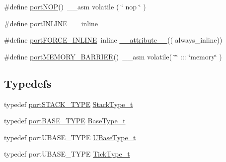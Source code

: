 \begin{DoxyCompactItemize}
\item 
\#define \hyperlink{externals_2freertos_2portable_2_g_c_c_2_r_i_s_c-_v_2portmacro_8h_a23c54dff0b50ff35563ef06c6d6d1835}{port\+N\+OP}()~\+\_\+\+\_\+asm volatile 	( \char`\"{} nop \char`\"{} )
\item 
\#define \hyperlink{externals_2freertos_2portable_2_g_c_c_2_r_i_s_c-_v_2portmacro_8h_a73448585c9c9e96500c2f0c9ea824601}{port\+I\+N\+L\+I\+NE}~\+\_\+\+\_\+inline
\item 
\#define \hyperlink{externals_2freertos_2portable_2_g_c_c_2_r_i_s_c-_v_2portmacro_8h_aaa356ca7932487d20a42d6839842d308}{port\+F\+O\+R\+C\+E\+\_\+\+I\+N\+L\+I\+NE}~inline \hyperlink{externals_2freertos_2portable_2_g_c_c_2_a_r_m___c_m4_f_2portmacro_8h_ac864e333c11a6614eab8e8542ba01ed0}{\+\_\+\+\_\+attribute\+\_\+\+\_\+}(( always\+\_\+inline))
\item 
\#define \hyperlink{externals_2freertos_2portable_2_g_c_c_2_r_i_s_c-_v_2portmacro_8h_a4b03d1af7eaa8e1c7788e17fc74482eb}{port\+M\+E\+M\+O\+R\+Y\+\_\+\+B\+A\+R\+R\+I\+ER}()~\+\_\+\+\_\+asm volatile( \char`\"{}\char`\"{} \+::: \char`\"{}memory\char`\"{} )
\end{DoxyCompactItemize}
\subsection*{Typedefs}
\begin{DoxyCompactItemize}
\item 
typedef \hyperlink{vendor_2ceedling_2plugins_2freertos_2vendor_2freertos_2portable_2_g_c_c_2_p_o_s_i_x_2portmacro_8h_ab0a294066ac7369b8f59a52d9491a92c}{port\+S\+T\+A\+C\+K\+\_\+\+T\+Y\+PE} \hyperlink{externals_2freertos_2portable_2_g_c_c_2_r_i_s_c-_v_2portmacro_8h_a84e9a8ba132feed0b2401c1f4e2ac63c}{Stack\+Type\+\_\+t}
\item 
typedef \hyperlink{vendor_2ceedling_2plugins_2freertos_2vendor_2freertos_2portable_2_g_c_c_2_p_o_s_i_x_2portmacro_8h_a1ebe82d24d764ae4e352f7c3a9f92c01}{port\+B\+A\+S\+E\+\_\+\+T\+Y\+PE} \hyperlink{externals_2freertos_2portable_2_g_c_c_2_r_i_s_c-_v_2portmacro_8h_a7b6a9cf84459e1e2b1d07d3b41ffb011}{Base\+Type\+\_\+t}
\item 
typedef port\+U\+B\+A\+S\+E\+\_\+\+T\+Y\+PE \hyperlink{externals_2freertos_2portable_2_g_c_c_2_r_i_s_c-_v_2portmacro_8h_a022f761f9698b55b7d6dbf4dc6fa7284}{U\+Base\+Type\+\_\+t}
\item 
typedef port\+U\+B\+A\+S\+E\+\_\+\+T\+Y\+PE \hyperlink{externals_2freertos_2portable_2_g_c_c_2_r_i_s_c-_v_2portmacro_8h_a3bd418c085056e3407a4c4f172780055}{Tick\+Type\+\_\+t}
\end{DoxyCompactItemize}
